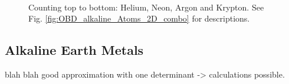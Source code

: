 \begin{figure}
\begin{center}
     \\
  \caption{Counting top to bottom: Helium, Neon, Argon and Krypton. See Fig. \ref{fig:OBD_alkaline_Atoms_2D_combo} for descriptions.}
  \label{fig:OBD_noble_Atoms_2D_combo}
 \end{center}
\end{figure}

 
 \clearpage
 
 
 \subsection{Alkaline Earth Metals}
 
 blah blah good approximation with one determinant -> calculations possible. 
 
